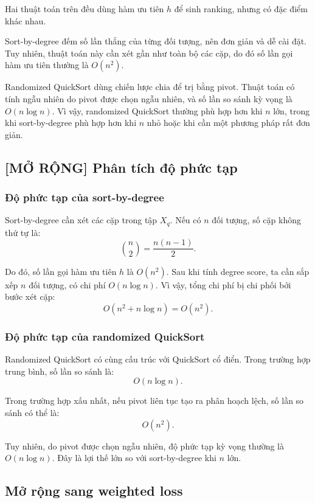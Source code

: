 Hai thuật toán trên đều dùng hàm ưu tiên \(h\) để sinh ranking, nhưng có đặc điểm khác nhau.

Sort-by-degree đếm số lần thắng của từng đối tượng, nên đơn giản và dễ cài đặt. Tuy nhiên, thuật toán này cần xét gần như toàn bộ các cặp, do đó số lần gọi hàm ưu tiên thường là \(O(n^2)\).

Randomized QuickSort dùng chiến lược chia để trị bằng pivot. Thuật toán có tính ngẫu nhiên do pivot được chọn ngẫu nhiên, và số lần so sánh kỳ vọng là \(O(n\log n)\). Vì vậy, randomized QuickSort thường phù hợp hơn khi \(n\) lớn, trong khi sort-by-degree phù hợp hơn khi \(n\) nhỏ hoặc khi cần một phương pháp rất đơn giản.

\subsection{[MỞ RỘNG] Phân tích độ phức tạp}

\subsubsection{Độ phức tạp của sort-by-degree}

Sort-by-degree cần xét các cặp trong tập \(X_q\). Nếu có \(n\) đối tượng, số cặp không thứ tự là:
\begin{equation}
    \binom{n}{2}
    =
    \frac{n(n-1)}{2}.
    \label{eq:section7-number-of-pairs}
\end{equation}

Do đó, số lần gọi hàm ưu tiên \(h\) là \(O(n^2)\). Sau khi tính degree score, ta cần sắp xếp \(n\) đối tượng, có chi phí \(O(n\log n)\). Vì vậy, tổng chi phí bị chi phối bởi bước xét cặp:
\[
    O(n^2+n\log n)=O(n^2).
\]

\subsubsection{Độ phức tạp của randomized QuickSort}

Randomized QuickSort có cùng cấu trúc với QuickSort cổ điển. Trong trường hợp trung bình, số lần so sánh là:
\[
    O(n\log n).
\]

Trong trường hợp xấu nhất, nếu pivot liên tục tạo ra phân hoạch lệch, số lần so sánh có thể là:
\[
    O(n^2).
\]

Tuy nhiên, do pivot được chọn ngẫu nhiên, độ phức tạp kỳ vọng thường là \(O(n\log n)\). Đây là lợi thế lớn so với sort-by-degree khi \(n\) lớn.

\subsection{Mở rộng sang weighted loss}

